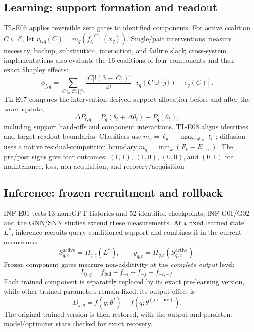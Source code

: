 \documentclass[conference,10pt]{IEEEtran}
\begin{document}
\subsection{Learning: support formation and readout}
TL-E06 applies reversible zero gates to identified components. For active coalition $C\subseteq\mathcal C$, let $v_{t,q}(C)=m_q(f_{\theta_t}^{(C)}(x_q))$. Single/pair interventions measure necessity, backup, substitution, interaction, and failure slack; cross-system implementations also evaluate the 16 coalitions of four components and their exact Shapley effects:
\begin{equation}
 \phi_{j,q}=\!\!\sum_{C\subseteq\mathcal C\setminus\{j\}}
 \frac{|C|!(3-|C|)!}{4!}\left[v_q(C\cup\{j\})-v_q(C)\right].
 \label{eq:shapley}
\end{equation}
TL-E07 compares the intervention-derived support allocation before and after the \emph{same} update,
\begin{equation}
 \Delta P_{t,q}=P_q(\theta_t+\Delta\theta_t)-P_q(\theta_t),
 \label{eq:realloc}
\end{equation}
including support hand-offs and component interactions. TL-E08 aligns identities and target readout boundaries. Classifiers use $m_q=\ell_y-\max_{c\ne y}\ell_c$; diffusion uses a native residual-competition boundary $m_q=\min_k(E_k-E_{\mathrm{true}})$. The pre/post signs give four outcomes: $(1,1)$, $(1,0)$, $(0,0)$, and $(0,1)$ for maintenance, loss, non-acquisition, and recovery/acquisition.

\subsection{Inference: frozen recruitment and rollback}
INF-E01 tests 13 nanoGPT histories and 52 identified checkpoints; INF-G01/G02 and the GNN/SNN studies extend these measurements. At a fixed learned state $L^*$, inference recruits query-conditioned support and combines it in the current occurrence:
\begin{equation}
 S_{q,c}^{\mathrm{active}}=\Pi_{q,c}(L^*),\qquad
 y_{q,c}=H_{q,c}(S_{q,c}^{\mathrm{active}}).
 \label{eq:inference}
\end{equation}
Frozen component gates measure non-additivity at the \emph{complete output} level:
\begin{equation}
 I_{ij,q}=f_{\mathrm{full}}-f_{-i}-f_{-j}+f_{-i,-j}.
 \label{eq:interaction}
\end{equation}
Each trained component is separately replaced by its exact pre-learning version, while other trained parameters remain fixed; its output effect is
\begin{equation}
 D_{j,q}=f(q;\theta^*)-f(q;\theta^{(j\leftarrow\mathrm{pre})}).
 \label{eq:rollback}
\end{equation}
The original trained version is then restored, with the output and persistent model/optimizer state checked for exact recovery.
\end{document}
